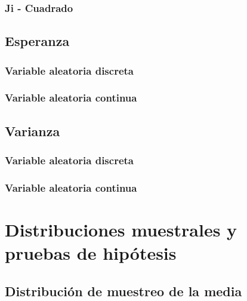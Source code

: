 \documentclass[
]{book}
\begin{document}
\hypertarget{ji---cuadrado}{%
\subsection{Ji - Cuadrado}\label{ji---cuadrado}}

\hypertarget{esperanza}{%
\section{Esperanza}\label{esperanza}}

\hypertarget{variable-aleatoria-discreta-1}{%
\subsection{Variable aleatoria discreta}\label{variable-aleatoria-discreta-1}}

\hypertarget{variable-aleatoria-continua-1}{%
\subsection{Variable aleatoria continua}\label{variable-aleatoria-continua-1}}

\hypertarget{varianza}{%
\section{Varianza}\label{varianza}}

\hypertarget{variable-aleatoria-discreta-2}{%
\subsection{Variable aleatoria discreta}\label{variable-aleatoria-discreta-2}}

\hypertarget{variable-aleatoria-continua-2}{%
\subsection{Variable aleatoria continua}\label{variable-aleatoria-continua-2}}

\hypertarget{distribuciones-muestrales-y-pruebas-de-hipuxf3tesis}{%
\chapter{Distribuciones muestrales y pruebas de hipótesis}\label{distribuciones-muestrales-y-pruebas-de-hipuxf3tesis}}

\hypertarget{distribuciuxf3n-de-muestreo-de-la-media}{%
\section{Distribución de muestreo de la media}\label{distribuciuxf3n-de-muestreo-de-la-media}}
\end{document}
